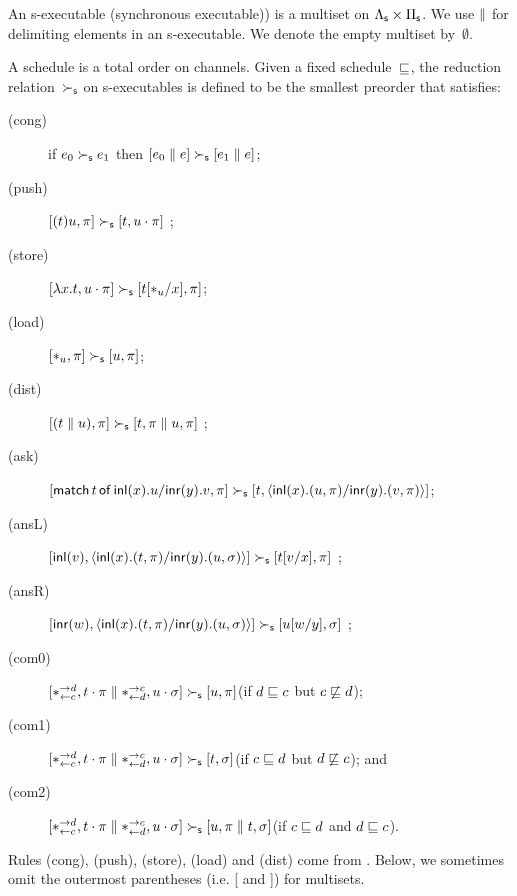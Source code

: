 An s-executable (synchronous executable)) is a multiset on $\sLambda\times\sPi$.
We use $\conc$ for delimiting elements in an s-executable.
We denote the empty multiset by~$\emptyset$.

A schedule is a total order on channels.
Given a fixed schedule~$\sche$, the reduction relation~$\sred$
on s-executables
is defined to be the smallest preorder
that satisfies:
\begin{description}
 \item[(cong)] if
      $e_0         \sred e_1$
      then
      $[e_0 \conc e] \sred [e_1\conc e]$\enspace;
 \item[(push)]
	    $[(t)u,\pi]      \sred [t,u\cdot\pi]$      \enspace;
 \item[(store)]
	    $[\lambda x.t,u\cdot\pi]
	     \sred
	     [t[\ast_u/x],      \pi]$\enspace;
 \item[(load)]
	    $[\ast_u,\pi]\sred [u,\pi]$\enspace;
 \item[(dist)]
           $[(t\conc u),\pi]  \sred [t,\pi\conc u,\pi]$ \enspace;
 \item[(ask)]
      $[\mat t x u y v,\pi]\sred [t,\mats x u \pi y v \pi]$\enspace;
 \item[(ansL)]
           $[\inl{v}, \mats xt\pi yu\sigma] \sred [t[v/x],\pi] $ \enspace;
 \item[(ansR)]
           $[\inr{w}, \mats xt\pi yu\sigma] \sred [u[w/y],\sigma] $ \enspace;
 \item[(com0)]
           $[\comod c{d}, t\cdot\pi\conc \comod{d}c,
           u\cdot\sigma] \sred
           [u,\pi]$\enspace(if $d\sche c$ but $c\not\sche d$)\enspace;
 \item[(com1)]
	    $[\comod c{d}, t\cdot\pi\conc \comod{d}c,
	    u\cdot\sigma] \sred
	    [t,\sigma]$\enspace(if $c\sche d$ but $d\not\sche c$)\enspace; and
 \item[(com2)]
	    $[\comod c{d}, t\cdot\pi\conc \comod{d}c,
	    u\cdot\sigma] \sred
	    [u,\pi\conc t,\sigma]$\enspace(if $c\sche d$ and $d\sche
       c$)\enspace.
\end{description}
Rules (cong), (push), (store), (load) and (dist) come from \citet{danos-krivine}.
Below, we sometimes omit the outermost parentheses (i.e. [ and ]) for multisets.


